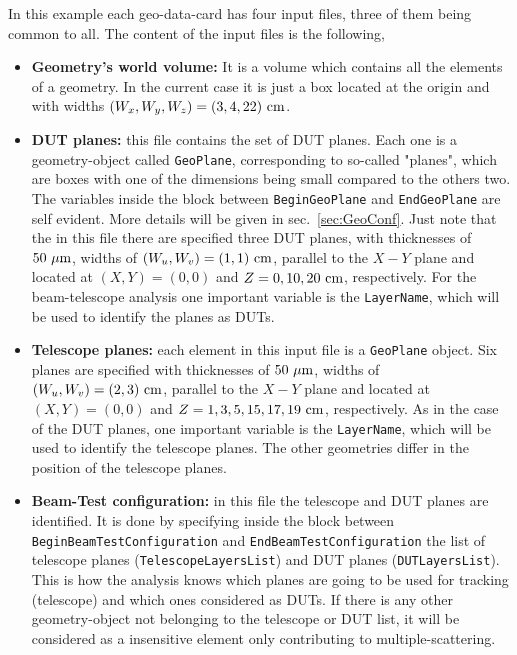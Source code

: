 In this example each geo-data-card has four input files, three of them being common to all. The content of the input files is the following,
\begin{itemize}
 \item  {\bf Geometry's world volume:} It is a volume which contains all the elements of a geometry. In the current case it is just a box 
 located at the origin and with widths $(W_x,W_y,W_z) = (3,4,22)~{\rm cm}$. 
 
 \item  {\bf DUT planes:} this file contains the set of DUT planes. Each one is a geometry-object called {\tt GeoPlane}, corresponding to so-called 
 "planes", which are boxes with one of the dimensions being small compared to the others two. The variables inside the block between {\tt BeginGeoPlane} and {\tt EndGeoPlane} are 
 self evident. More details will be given in sec.~\ref{sec:GeoConf}. Just note that the in this file there are specified three 
 DUT planes, with thicknesses of $50~{\rm \mu m}$, widths of $(W_u,W_v) = (1,1)~{\rm cm}$, parallel to the $X-Y$ plane and located at 
 $(X,Y) = (0,0)$ and $Z = 0,10,20~{\rm cm}$, respectively. For the beam-telescope analysis one important variable is the {\tt LayerName},
 which will be used to identify the planes as DUTs.
 
 \item  {\bf Telescope planes:} each element in this input file is a {\tt GeoPlane} object. Six planes are specified 
 with thicknesses of $50~{\rm \mu m}$, widths of $(W_u,W_v) = (2,3)~{\rm cm}$, parallel to the $X-Y$ plane and located at $(X,Y) = (0,0)$ and 
 $Z = 1,3,5,15,17,19~{\rm cm}$, respectively. As in the case of the DUT planes, one important variable is the {\tt LayerName}, which will be 
 used to identify the telescope planes. The other geometries differ in the position of the telescope planes.
 
 \item  {\bf Beam-Test configuration:} in this file the telescope and DUT planes are identified. It is done by specifying inside the block between
 {\tt BeginBeamTestConfiguration} and {\tt EndBeamTestConfiguration} the list of telescope planes ({\tt TelescopeLayersList}) and DUT planes 
 ({\tt DUTLayersList}). This is how the analysis knows which planes are going to be used for tracking (telescope) and which ones considered 
 as DUTs. If there is any other geometry-object not belonging to the telescope or DUT list, it will be considered as a insensitive element 
 only contributing to multiple-scattering.
 
\end{itemize}


